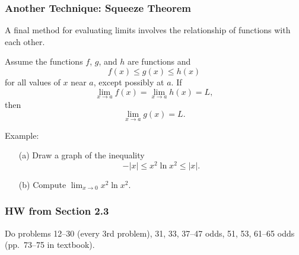 \documentclass[14pt]{beamer}
\begin{document}

\begin{frame}
\frametitle{Another Technique: Squeeze Theorem}
\small
A final method for evaluating limits involves the relationship of functions with each other.
\footnotesize
\begin{thm}  Assume the functions $f$, $g$, and $h$ are functions and 
\[f(x)\le g(x) \le h(x)\] 
for all values of $x$ near $a$, except possibly at $a$.  If 
\[\displaystyle\lim_{x \to a}f(x)=\displaystyle\lim_{x \to a} h(x)=L,\] 
then 
\[\displaystyle\lim_{x \to a} g(x)=L.\] \end{thm}
\end{frame}

\begin{frame}
Example: 

\vspace{0.5pc}
\begin{itemize}
\item[(a)]Draw a graph of the inequality 
\[-|x| \le x^2 \ln x^2 \le |x|.\]

\vspace{0.5pc}
\item[(b)] Compute $\displaystyle\lim_{x \to 0} x^2 \ln x^2.$
\end{itemize}
\end{frame}

\begin{frame}
\frametitle{HW from Section 2.3}
Do problems 12--30 (every 3rd problem), 31, 33, 37--47 odds, 51, 53, 61--65 odds (pp.\ 73--75 in textbook).
\end{frame}

\begin{comment}
\end{comment}
\end{document}
